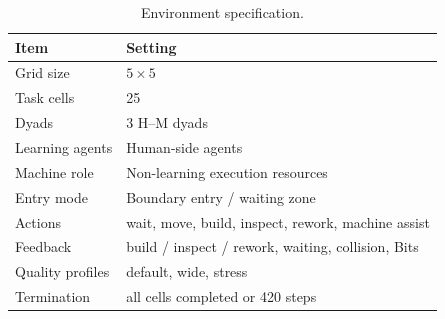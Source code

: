 \documentclass[fleqn,10pt]{wlpeerj}
\begin{document}
\begin{table}[htbp]
\centering
\caption{Scenario layers and their modeling roles.}
\label{tab:scenario_layers}
\end{table}

\begin{table}[htbp]
\centering
\caption{Environment specification.}
\label{tab:env_detail}
\begin{tabular}{ll}
\toprule
Item & Setting \\
\midrule
Grid size & $5\times5$ \\
Task cells & 25 \\
Dyads & 3 H--M dyads \\
Learning agents & Human-side agents \\
Machine role & Non-learning execution resources \\
Entry mode & Boundary entry / waiting zone \\
Actions & wait, move, build, inspect, rework, machine assist \\
Feedback & build / inspect / rework, waiting, collision, Bits \\
Quality profiles & default, wide, stress \\
Termination & all cells completed or 420 steps \\
\bottomrule
\end{tabular}
\end{table}
\end{document}
